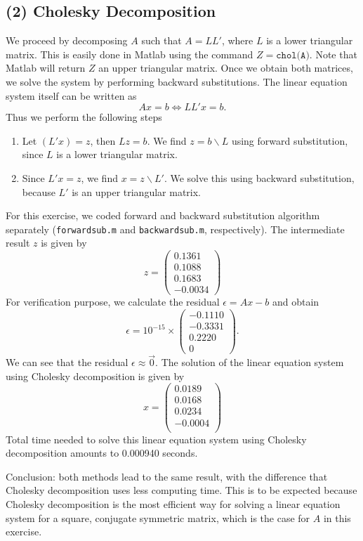 \documentclass[11pt]{article}
\newcommand{\1}{\mathbbm{1}}
\begin{document}
\subsection*{(2) Cholesky Decomposition}
We proceed by decomposing $A$ such that $A=LL'$, where $L$ is a lower triangular matrix. This is easily done in Matlab using the command $Z= \texttt{chol(A)}$. Note that Matlab will return $Z$ an upper triangular matrix. Once we obtain both matrices, we solve the system by performing backward substitutions. The linear equation system itself can be written as 
\[Ax=b \Leftrightarrow LL'x =b.\]
Thus we perform the following steps
\begin{enumerate}
	\item Let $(L'x) =z$, then $Lz=b$. We find $z = b\backslash L$ using forward substitution, since $L$ is a lower triangular matrix.
	\item Since $L'x = z$, we find $x=z\backslash L'$. We solve this using backward substitution, because $L'$ is an upper triangular matrix.
\end{enumerate} 
For this exercise, we coded forward and backward substitution algorithm separately (\texttt{forwardsub.m} and \texttt{backwardsub.m}, respectively). The intermediate result $z$ is given by
\[
z = \begin{pmatrix}
 0.1361\\
0.1088\\
0.1683\\
-0.0034
\end{pmatrix}
\]
For verification purpose, we calculate the residual $\epsilon = Ax-b$ and obtain
\[
\epsilon =   10^{-15} \times \begin{pmatrix}
   -0.1110\\
-0.3331\\
0.2220\\
0
\end{pmatrix}.
\]
We can see that the residual $\epsilon\approx\vec{0}$. The solution of the linear equation system using Cholesky decomposition is given by
\[x = \begin{pmatrix}
	0.0189\\
	0.0168\\
	0.0234\\
	-0.0004\\
\end{pmatrix}\]
Total time needed to solve this linear equation system using Cholesky decomposition amounts to 0.000940 seconds.

Conclusion: both methods lead to the same result, with the difference that Cholesky decomposition uses less computing time. This is to be expected because Cholesky decomposition is the most efficient way for solving a linear equation system for a square, conjugate symmetric matrix, which is the case for $A$ in this exercise. 
\end{document}
